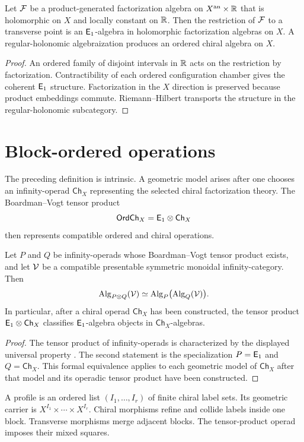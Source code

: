 \begin{theorem}
Let $\mathcal F$ be a product-generated factorization algebra on $X^{\mathrm{an}}\times\mathbb R$ that is holomorphic on $X$ and locally constant on $\mathbb R$. Then the restriction of $\mathcal F$ to a transverse point is an $\mathsf E_1$-algebra in holomorphic factorization algebras on $X$. A regular-holonomic algebraization produces an ordered chiral algebra on $X$.
\end{theorem}
\begin{proof}
An ordered family of disjoint intervals in $\mathbb R$ acts on the restriction by factorization. Contractibility of each ordered configuration chamber gives the coherent $\mathsf E_1$ structure. Factorization in the $X$ direction is preserved because product embeddings commute. Riemann--Hilbert transports the structure in the regular-holonomic subcategory.
\end{proof}

\chapter{Block-ordered operations}
The preceding definition is intrinsic. A geometric model arises after one chooses an infinity-operad $\mathsf{Ch}_X$ representing the selected chiral factorization theory. The Boardman--Vogt tensor product
\[
 \mathsf{OrdCh}_X=\mathsf E_1\otimes\mathsf{Ch}_X
\]
then represents compatible ordered and chiral operations.

\begin{theorem}
Let $P$ and $Q$ be infinity-operads whose Boardman--Vogt tensor product exists, and let $\mathcal V$ be a compatible presentable symmetric monoidal infinity-category.  Then
\[
 \operatorname{Alg}_{P\otimes Q}(\mathcal V)
 \simeq
 \operatorname{Alg}_P\bigl(\operatorname{Alg}_Q(\mathcal V)\bigr).
\]
In particular, after a chiral operad $\mathsf{Ch}_X$ has been constructed, the tensor product $\mathsf E_1\otimes\mathsf{Ch}_X$ classifies $\mathsf E_1$-algebra objects in $\mathsf{Ch}_X$-algebras.
\end{theorem}
\begin{proof}
The tensor product of infinity-operads is characterized by the displayed universal property \cite{LurieHA}.  The second statement is the specialization $P=\mathsf E_1$ and $Q=\mathsf{Ch}_X$.  This formal equivalence applies to each geometric model of $\mathsf{Ch}_X$ after that model and its operadic tensor product have been constructed.
\end{proof}

A profile is an ordered list $(I_1,\ldots,I_r)$ of finite chiral label sets. Its geometric carrier is $X^{I_1}\times\cdots\times X^{I_r}$. Chiral morphisms refine and collide labels inside one block. Transverse morphisms merge adjacent blocks. The tensor-product operad imposes their mixed squares.

